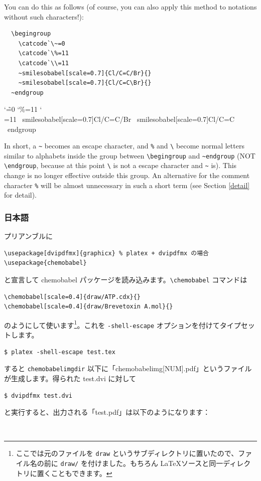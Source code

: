\documentclass[12pt]{jsarticle}
\begin{document}
You can do this as follows (of course, you can also apply this method to notations without such characters!):
\begin{verbatim}
  \begingroup
    \catcode`\~=0
    \catcode`\%=11
    \catcode`\\=11
    ~smilesobabel[scale=0.7]{Cl/C=C/Br}{}
    ~smilesobabel[scale=0.7]{Cl/C=C\Br}{}
  ~endgroup
\end{verbatim}
  \begingroup
    \catcode`\~=0
    \catcode`\%=11
    \catcode`\\=11
    ~smilesobabel[scale=0.7]{Cl/C=C/Br}{}
    ~smilesobabel[scale=0.7]{Cl/C=C\Br}{}
  ~endgroup

In short, a \verb|~| becomes an escape character, and \verb|%| and \verb|\| become normal letters similar to alphabets inside the group between \verb|\begingroup| and \verb|~endgroup| (NOT \verb|\endgroup|, because at this point \verb|\| is not a escape character and \verb|~| is).
This change is no longer effective outside this group. An alternative for the comment character \verb|%| will be almost unnecessary in such a short term (see Section \ref{detail} for detail).

\clearpage

\subsubsection{日本語}

プリアンブルに
\begin{verbatim}
\usepackage[dvipdfmx]{graphicx} % platex + dvipdfmx の場合
\usepackage{chemobabel}
\end{verbatim}
と宣言して \textsf{chemobabel} パッケージを読み込みます。\verb|\chemobabel| コマンドは
\begin{verbatim}
\chemobabel[scale=0.4]{draw/ATP.cdx}{}
\chemobabel[scale=0.4]{draw/Brevetoxin A.mol}{}
\end{verbatim}
のようにして使います\footnote{ここでは元のファイルを \texttt{draw} というサブディレクトリに置いたので、ファイル名の前に \texttt{draw/} を付けました。もちろん \LaTeX ソースと同一ディレクトリに置くこともできます。}。これを \verb|-shell-escape| オプションを付けてタイプセットします。
\begin{verbatim}
$ platex -shell-escape test.tex
\end{verbatim}
すると \verb|chemobabelimgdir| 以下に「chemobabelimg[NUM].pdf」というファイルが生成します。得られた test.dvi に対して
\begin{verbatim}
$ dvipdfmx test.dvi
\end{verbatim}
と実行すると、出力される「test.pdf」は以下のようになります：
\begin{figure}[h]
  \centering
   \\
\end{figure}
\end{document}
